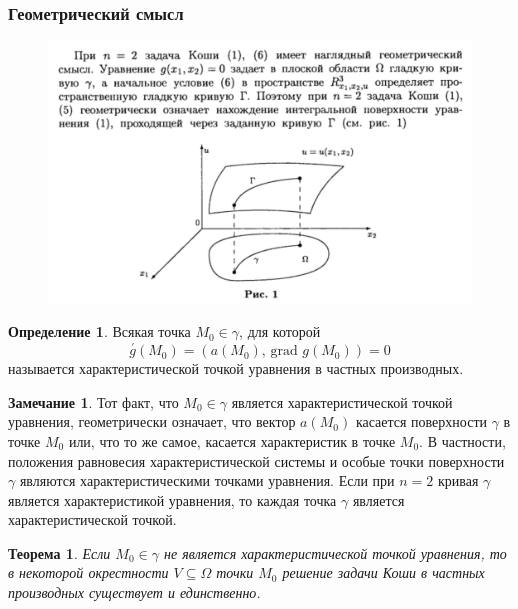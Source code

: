 \documentclass[a4paper,12pt]{article}
\theoremstyle{plain}
\newtheorem{theorem}{Теорема}[section]
\theoremstyle{definition}
\newtheorem{definition}{Определение}[section]
\newtheorem*{note}{Замечание}
\theoremstyle{remark}
\begin{document}
\subsubsection*{Геометрический смысл}
\begin{figure}[h]
	\includegraphics[scale=0.7]{img/geom_mean.png}
\end{figure}

\begin{definition}
	Всякая точка $M_0 \in \gamma$, для которой
	\[\overset{'}{g}(M_0) = (a(M_0),\,\text{grad }g(M_0)) = 0\]
	называется характеристической точкой уравнения в частных производных.
\end{definition}

\begin{note}
	Тот факт, что $M_0 \in \gamma$ является характеристической точкой уравнения, геометрически означает, что вектор $a(M_0)$ касается поверхности $\gamma$ в точке $M_0$ или, что то же самое, касается характеристик в точке $M_0$. В частности, положения равновесия характеристической системы и особые точки поверхности $\gamma$ являются характеристическими точками уравнения. Если при $n = 2$ кривая $\gamma$ является характеристикой уравнения, то каждая точка $\gamma$ является характеристической точкой.
\end{note}

\begin{theorem}
	Если $M_0 \in \gamma$ не является характеристической точкой уравнения, то в некоторой окрестности $V \subseteq \Omega$ точки $M_0$ решение задачи Коши в частных производных существует и единственно.
\end{theorem}
\end{document}
